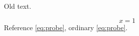 \documentclass{memoir}
\begin{document}
\begingroup{}Old text.\par\endgroup
\begin{equation}x=1\label{eq:probe}\end{equation}
Reference \eqref{eq:probe}, ordinary \ref{eq:probe}.
\end{document}
